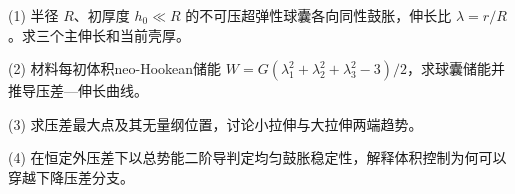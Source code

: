 (1) 半径 \(R\)、初厚度 \(h_0\ll R\) 的不可压超弹性球囊各向同性鼓胀，伸长比 \(\lambda=r/R\)。求三个主伸长和当前壳厚。

(2) 材料每初体积neo-Hookean储能 \(W=G(\lambda_1^2+\lambda_2^2+\lambda_3^2-3)/2\)，求球囊储能并推导压差—伸长曲线。

(3) 求压差最大点及其无量纲位置，讨论小拉伸与大拉伸两端趋势。

(4) 在恒定外压差下以总势能二阶导判定均匀鼓胀稳定性，解释体积控制为何可以穿越下降压差分支。
